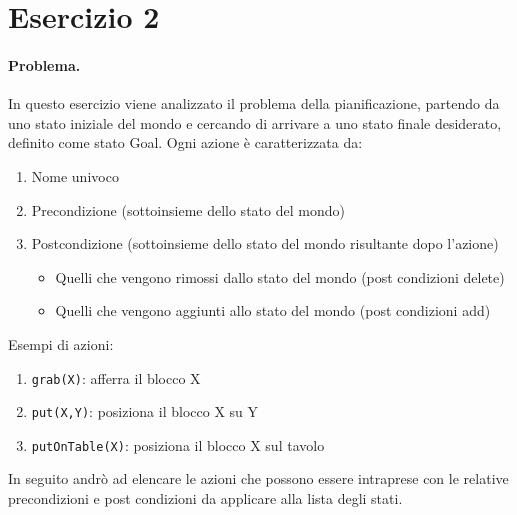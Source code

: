 \documentclass[12pt,twoside]{report}
\begin{document}
\cleardoublepage

\section*{Esercizio 2}

\paragraph{Problema.} In questo esercizio viene analizzato il problema della pianificazione, partendo da uno stato iniziale del mondo e cercando di arrivare a uno stato finale desiderato, definito come stato Goal. Ogni azione è caratterizzata da:
\begin{enumerate}
    \item Nome univoco
    \item Precondizione (sottoinsieme dello stato del mondo)
    \item Postcondizione (sottoinsieme dello stato del mondo risultante dopo l'azione)
    \begin{itemize}
        \item Quelli che vengono rimossi dallo stato del mondo (post condizioni delete)
        \item Quelli che vengono aggiunti allo stato del mondo (post condizioni add)
    \end{itemize}
\end{enumerate}

Esempi di azioni:
\begin{enumerate}
    \item \texttt{grab(X)}: afferra il blocco X
    \item \texttt{put(X,Y)}: posiziona il blocco X su Y
    \item \texttt{putOnTable(X)}: posiziona il blocco X sul tavolo
\end{enumerate}


In seguito andrò ad elencare le azioni che possono essere intraprese con le relative precondizioni e post condizioni da applicare alla lista degli stati.
\end{document}
